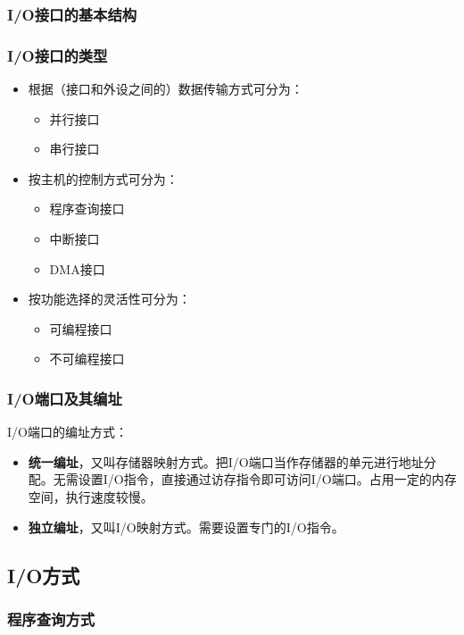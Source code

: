 \documentclass[12pt, a4paper, oneside]{ctexart}
\begin{document}
\subsubsection{I/O接口的基本结构}

\subsubsection{I/O接口的类型}

\begin{itemize}
  \item 根据（接口和外设之间的）数据传输方式可分为：
  \begin{itemize}
    \item 并行接口
    \item 串行接口
  \end{itemize}
  \item 按主机的控制方式可分为：
  \begin{itemize}
    \item 程序查询接口
    \item 中断接口
    \item DMA接口
  \end{itemize}
  \item 按功能选择的灵活性可分为：
  \begin{itemize}
    \item 可编程接口
    \item 不可编程接口
  \end{itemize}
\end{itemize}

\subsubsection{I/O端口及其编址}

I/O端口的编址方式：
\begin{itemize}
  \item {\bf 统一编址}，又叫存储器映射方式。把I/O端口当作存储器的单元进行地址分配。无需设置I/O指令，直接通过访存指令即可访问I/O端口。占用一定的内存空间，执行速度较慢。
  \item {\bf 独立编址}，又叫I/O映射方式。需要设置专门的I/O指令。
\end{itemize}

\subsection{I/O方式}

\subsubsection{程序查询方式}
\end{document}
